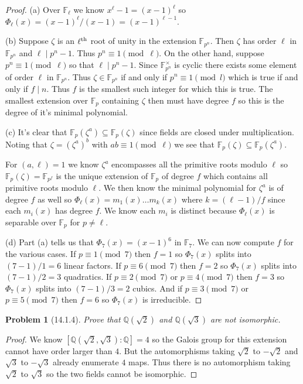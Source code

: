 \documentclass{article}
\newtheorem{problem}{Problem}
\begin{document}
\begin{proof}
(a) Over $\mathbb{F}_{\ell}$ we know $x^{\ell} - 1 = (x-1)^{\ell}$ so $\Phi_{\ell}(x) = (x-1)^{\ell}/(x-1) = (x-1)^{\ell-1}$.

(b) Suppose $\zeta$ is an $\ell^{\textup{th}}$ root of unity in the extension $\mathbb{F}_{p^n}$. Then $\zeta$ has order $\ell$ in $\mathbb{F}_{p^n}$ and $\ell \mid p^n - 1$. Thus $p^n \equiv 1 \pmod{\ell}$. On the other hand, suppose $p^n \equiv 1 \pmod{\ell}$ so that $\ell \mid p^n - 1$. Since $\mathbb{F}_{p^n}^{\times}$ is cyclic there exists some element of order $\ell$ in $\mathbb{F}_{p^n}$. Thus $\zeta \in \mathbb{F}_{p^n}$ if and only if $p^n \equiv 1 \pmod{l}$ which is true if and only if $f \mid n$. Thus $f$ is the smallest such integer for which this is true. The smallest extension over $\mathbb{F}_p$ containing $\zeta$ then must have degree $f$ so this is the degree of it's minimal polynomial.

(c) It's clear that $\mathbb{F}_p(\zeta^a) \subseteq \mathbb{F}_p(\zeta)$ since fields are closed under multiplication. Noting that $\zeta = (\zeta^a)^b$ with $ab \equiv 1 \pmod{\ell}$ we see that $\mathbb{F}_p(\zeta) \subseteq \mathbb{F}_p(\zeta^a)$.

For $(a,\ell) = 1$ we know $\zeta^a$ encompasses all the primitive roots modulo $\ell$ so $\mathbb{F}_p(\zeta) = \mathbb{F}_{p^f}$ is the unique extension of $\mathbb{F}_p$ of degree $f$ which contains all primitive roots modulo $\ell$. We then know the minimal polynomial for $\zeta^a$ is of degree $f$ as well so $\Phi_{\ell}(x) = m_1(x) \dots m_k(x)$ where $k = (\ell-1)/f$ since each $m_i(x)$ has degree $f$. We know each $m_i$ is distinct because $\Phi_{\ell}(x)$ is separable over $\mathbb{F}_p$ for $p \neq \ell$.

(d) Part (a) tells us that $\Phi_7(x) = (x-1)^6$ in $\mathbb{F}_7$. We can now compute $f$ for the various cases. If $p \equiv 1 \pmod{7}$ then $f = 1$ so $\Phi_7(x)$ splits into $(7-1)/1 = 6$ linear factors. If $p \equiv 6 \pmod{7}$ then $f = 2$ so $\Phi_7(x)$ splits into $(7-1)/2 = 3$ quadratics. If $p \equiv 2 \pmod{7}$ or $p \equiv 4 \pmod{7}$ then $f = 3$ so $\Phi_7(x)$ splits into $(7-1)/3 = 2$ cubics. And if $p \equiv 3 \pmod{7}$ or $p \equiv 5 \pmod{7}$ then $f = 6$ so $\Phi_7(x)$ is irreducible.
\end{proof}

\begin{problem}[14.1.4]
Prove that $\mathbb{Q}(\sqrt{2})$ and $\mathbb{Q}(\sqrt{3})$ are not isomorphic.
\end{problem}
\begin{proof}
We know $[\mathbb{Q}(\sqrt{2},\sqrt{3}) : \mathbb{Q}] = 4$ so the Galois group for this extension cannot have order larger than $4$. But the automorphisms taking $\sqrt{2}$ to $-\sqrt{2}$ and $\sqrt{3}$ to $-\sqrt{3}$ already enumerate $4$ maps. Thus there is no automorphism taking $\sqrt{2}$ to $\sqrt{3}$ so the two fields cannot be isomorphic.
\end{proof}
\end{document}
